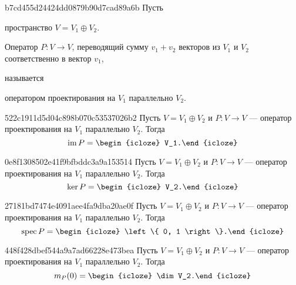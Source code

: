 \begin{note}{b7cd455d24424dd0879b90d7cad89a6b}
    Пусть \begin{icloze}{3}пространство \( V = V_1 \oplus V_2 \).\end{icloze}
    \begin{icloze}{1}Оператор \( P : V \to V \), переводящий сумму \( v_1 + v_2 \) векторов из \( V_1 \) и \( V_2 \) соответственно в вектор \( v_1 \),\end{icloze} называется \begin{icloze}{2}оператором проектирования на \( V_1 \) параллельно \( V_2 \).\end{icloze}
\end{note}

\begin{note}{522c1911d5d04c898b070c53537026b2}
    Пусть \( V = V_1 \oplus V_2 \) и \( P : V \to V \) --- оператор проектирования на \( V_1 \) параллельно \( V_2 \).
    Тогда
    \[
        \operatorname{im} P = \begin{icloze}{1}V_1.\end{icloze}
    \]
\end{note}

\begin{note}{0e8f1308502e41f9bfbddc3a9a153514}
    Пусть \( V = V_1 \oplus V_2 \) и \( P : V \to V \) --- оператор проектирования на \( V_1 \) параллельно \( V_2 \).
    Тогда
    \[
        \ker P = \begin{icloze}{1}V_2.\end{icloze}
    \]
\end{note}

\begin{note}{27181bd7474e4091aee4fa9dba20ae0f}
    Пусть \( V = V_1 \oplus V_2 \) и \( P : V \to V \) --- оператор проектирования на \( V_1 \) параллельно \( V_2 \).
    Тогда
    \[
        \operatorname{spec} P = \begin{icloze}{1}\left\{ 0, 1 \right\}.\end{icloze}
    \]
\end{note}

\begin{note}{448f428dbef544a9a7ad66228e473bea}
    Пусть \( V = V_1 \oplus V_2 \) и \( P : V \to V \) --- оператор проектирования на \( V_1 \) параллельно \( V_2 \).
    Тогда
    \[
        m_P (0) = \begin{icloze}{1}\dim V_2.\end{icloze}
    \]
\end{note}

